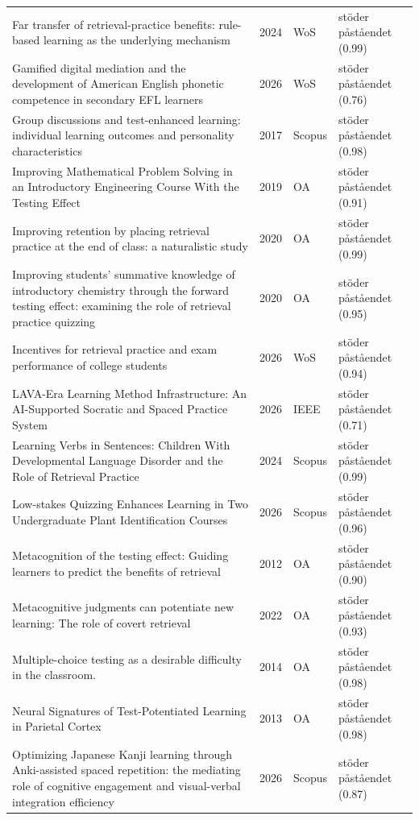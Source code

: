 \begin{longtable}{@{}%
  >{\raggedright\arraybackslash}p{}c%
  >{\raggedright\arraybackslash}p{}%
  >{\raggedright\arraybackslash}p{}@{}}
Far transfer of retrieval-practice benefits: rule-based learning as the underlying mechanism & 2024 & WoS & stöder påståendet (0.99) \\
Gamified digital mediation and the development of American English phonetic competence in secondary EFL learners & 2026 & WoS & stöder påståendet (0.76) \\
Group discussions and test-enhanced learning: individual learning outcomes and personality characteristics & 2017 & Scopus & stöder påståendet (0.98) \\
Improving Mathematical Problem Solving in an Introductory Engineering Course With the Testing Effect & 2019 & OA & stöder påståendet (0.91) \\
Improving retention by placing retrieval practice at the end of class: a naturalistic study & 2020 & OA & stöder påståendet (0.99) \\
Improving students' summative knowledge of introductory chemistry through the forward testing effect: examining the role of retrieval practice quizzing & 2020 & OA & stöder påståendet (0.95) \\
Incentives for retrieval practice and exam performance of college students & 2026 & WoS & stöder påståendet (0.94) \\
LAVA-Era Learning Method Infrastructure: An AI-Supported Socratic and Spaced Practice System & 2026 & IEEE & stöder påståendet (0.71) \\
Learning Verbs in Sentences: Children With Developmental Language Disorder and the Role of Retrieval Practice & 2024 & Scopus & stöder påståendet (0.99) \\
Low-stakes Quizzing Enhances Learning in Two Undergraduate Plant Identification Courses & 2026 & Scopus & stöder påståendet (0.96) \\
Metacognition of the testing effect: Guiding learners to predict the benefits of retrieval & 2012 & OA & stöder påståendet (0.90) \\
Metacognitive judgments can potentiate new learning: The role of covert retrieval & 2022 & OA & stöder påståendet (0.93) \\
Multiple-choice testing as a desirable difficulty in the classroom. & 2014 & OA & stöder påståendet (0.98) \\
Neural Signatures of Test-Potentiated Learning in Parietal Cortex & 2013 & OA & stöder påståendet (0.98) \\
Optimizing Japanese Kanji learning through Anki-assisted spaced repetition: the mediating role of cognitive engagement and visual-verbal integration efficiency & 2026 & Scopus & stöder påståendet (0.87) \\

\end{longtable}
